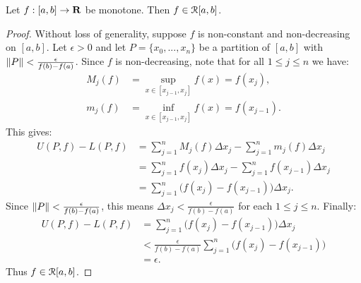 \documentclass[10pt,twoside,openany]{memoir}
\begin{document}
    \begin{theorem}
        Let $f:[a,b] \rightarrow \mathbf{R}$ be monotone. Then $f \in \mathcal{R}[a,b]$.
    \end{theorem}
        \begin{proof}
            Without loss of generality, suppose $f$ is non-constant and non-decreasing on $[a,b]$. Let $\epsilon > 0$ and let $P = \{x_0,...,x_n\}$ be a partition of $[a,b]$ with $\left\lVert P \right\rVert < \frac{\epsilon}{f(b) - f(a)}$. Since $f$ is non-decreasing, note that for all $1 \leq j \leq n$ we have:
                \begin{equation*}
                \begin{split}
                    M_j(f) & = \sup_{x \in [x_{j-1},x_j]}f(x) = f(x_j), \\
                    m_j(f) & = \inf_{x \in [x_{j-1},x_j]}f(x) = f(x_{j-1}).
                \end{split}
                \end{equation*}
            This gives:
                \begin{equation*}
                \begin{split}
                    U(P,f) - L(P,f)
                    & = \sum_{j = 1}^n M_j(f)\Delta x_j - \sum_{j = 1}^n m_j(f)\Delta x_j \\
                    & = \sum_{j = 1}^n f(x_j)\Delta x_j - \sum_{j = 1}^n f(x_{j-1})\Delta x_j \\
                    & = \sum_{j = 1}^n \bigl(f(x_j) - f(x_{j-1})\bigr)\Delta x_j.
                \end{split}
                \end{equation*}
            Since $\left\lVert P \right\rVert < \frac{\epsilon}{f(b) - f(a)}$, this means $\Delta x_j < \frac{\epsilon}{f(b)-f(a)}$ for each $1 \leq j \leq n$. Finally:
                \begin{equation*}
                \begin{split}
                    U(P,f) - L(P,f)
                    & = \sum_{j = 1}^n \bigl(f(x_j) - f(x_{j-1})\bigr)\Delta x_j \\
                    & < \frac{\epsilon}{f(b) - f(a)}\sum_{j = 1}^n \bigl(f(x_j) - f(x_{j-1})\bigr) \\
                    & = \epsilon.
                \end{split}
                \end{equation*}
            Thus $f \in \mathcal{R}[a,b]$.
        \end{proof}
\end{document}
